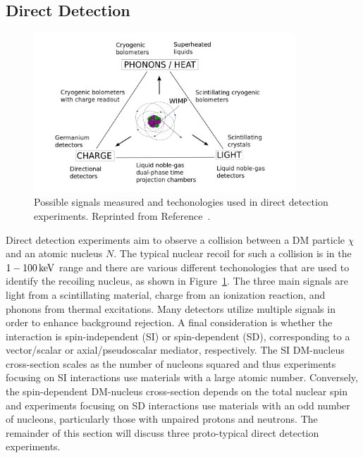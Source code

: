 \subsection{Direct Detection}
\label{sec:dm_direct}

\begin{figure}[htbp]
  \centering
  \includegraphics[width=0.875\textwidth]{DarkMatter/Figures/direct_triangle.png}
  \caption{
    Possible signals measured and techonologies used in direct detection experiments.
    Reprinted from Reference~\cite{}. %
  }
  \label{fig:direct_triangle}
\end{figure}

Direct detection experiments aim to observe a collision between a DM particle $\chi$ and an atomic nucleus $N$.
The typical nuclear recoil for such a collision is in the $1-100\,\text{ke\hspace{-.08em}V}$ range and there are various different techonologies that are used to identify the recoiling nucleus, as shown in Figure~\ref{fig:direct_triangle}.
The three main signals are light from a scintillating material, charge from an ionization reaction, and phonons from thermal excitations.
Many detectors utilize multiple signals in order to enhance background rejection.
A final consideration is whether the interaction is spin-independent (SI) or spin-dependent (SD), corresponding to a vector/scalar or axial/pseudoscalar mediator, respectively. 
The SI DM-nucleus cross-section scales as the number of nucleons squared and thus experiments focusing on SI interactions use materials with a large atomic number.
Conversely, the spin-dependent DM-nucleus cross-section depends on the total nuclear spin and experiments focusing on SD interactions use materials with an odd number of nucleons, particularly those with unpaired protons and neutrons.
The remainder of this section will discuss three proto-typical direct detection experiments.

